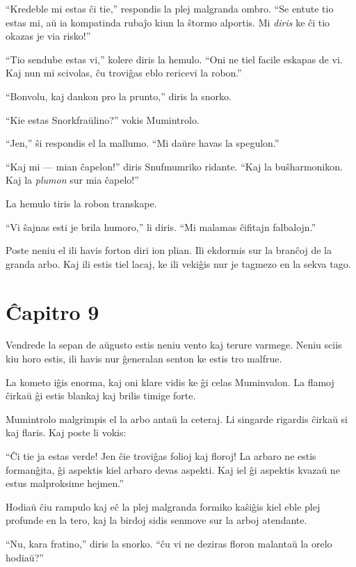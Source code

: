 ``Kredeble mi estas ĉi tie,'' respondis la plej malgranda ombro. ``Se entute tio estas mi, aŭ ia kompatinda rubaĵo kiun la ŝtormo alportis. Mi \emph{diris} ke ĉi tio okazas je via risko!''

``Tio sendube estas vi,'' kolere diris la hemulo. ``Oni ne tiel facile eskapas de vi. Kaj nun mi scivolas, ĉu troviĝas eblo rericevi la robon.''

``Bonvolu, kaj dankon pro la prunto,'' diris la snorko.

``Kie estas Snorkfraŭlino?'' vokis Mumintrolo.

``Jen,'' ŝi respondis el la mallumo. ``Mi daŭre havas la spegulon.''

``Kaj mi --- mian ĉapelon!'' diris Snufmumriko ridante. ``Kaj la buŝharmonikon. Kaj la \emph{plumon} sur mia ĉapelo!''

La hemulo tiris la robon transkape.

``Vi ŝajnas esti je brila humoro,'' li diris. ``Mi malamas ĉifitajn falbalojn.''

Poste neniu el ili havis forton diri ion plian. Ili ekdormis sur la branĉoj de la granda arbo. Kaj ili estis tiel lacaj, ke ili vekiĝis nur je tagmezo en la sekva tago.

\chapter*[Ĉapitro 9]{Ĉapitro 9}


Vendrede la sepan de aŭgusto estis neniu vento kaj terure varmege. Neniu sciis kiu horo estis, ili havis nur ĝeneralan senton ke estis tro malfrue.

La kometo iĝis enorma, kaj oni klare vidis ke ĝi celas Muminvalon. La flamoj ĉirkaŭ ĝi estis blankaj kaj brilis timige forte.

Mumintrolo malgrimpis el la arbo antaŭ la ceteraj. Li singarde rigardis ĉirkaŭ si kaj flaris. Kaj poste li vokis:

``Ĉi tie ja estas verde! Jen ĉie troviĝas folioj kaj floroj! La arbaro ne estis formanĝita, ĝi aspektis kiel arbaro devas aspekti. Kaj iel ĝi aspektis kvazaŭ ne estus malproksime hejmen.''

Hodiaŭ ĉiu rampulo kaj eĉ la plej malgranda formiko kaŝiĝis kiel eble plej profunde en la tero, kaj la birdoj sidis senmove sur la arboj atendante.

``Nu, kara fratino,'' diris la snorko. ``ĉu vi ne deziras floron malantaŭ la orelo hodiaŭ?''

